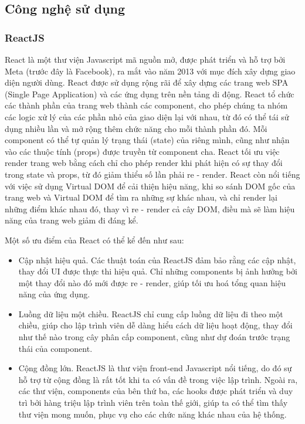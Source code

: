 \subsection{Công nghệ sử dụng}
\subsubsection{ReactJS}
React là một thư viện Javascript mã nguồn mở, được phát triển và hỗ trợ bởi
Meta (trước đây là Facebook), ra mắt vào năm 2013 với mục đích xây dựng giao
diện người dùng. React được sử dụng rộng rãi để xây dựng các trang web SPA
(Single Page Application) và các ứng dụng trên nền tảng di động. React tổ chức
các thành phần của trang web thành các component, cho phép chúng ta nhóm các
logic xử lý của các phần nhỏ của giao diện lại với nhau, từ đó có thể tái sử
dụng nhiều lần và mở rộng thêm chức năng cho mỗi thành phần đó. Mỗi component
có thể tự quản lý trạng thái (state) của riêng mình, cũng như nhận vào các
thuộc tính (props) được truyền từ component cha. React tối ưu việc render trang
web bằng cách chỉ cho phép render khi phát hiện có sự thay đổi trong state và
props, từ đó giảm thiểu số lần phải re - render. React còn nổi tiếng với việc
sử dụng Virtual DOM để cải thiện hiệu năng, khi so sánh DOM gốc của trang web
và Virtual DOM để tìm ra những sự khác nhau, và chỉ render lại những điểm khác
nhau đó, thay vì re - render cả cây DOM, điều mà sẽ làm hiệu năng của trang web
giảm đi đáng kể.
\par
Một số ưu điểm của React có thể kể đến như sau:
\begin{itemize}
    \item Cập nhật hiệu quả. Các thuật toán của ReactJS đảm bảo rằng các cập nhật, thay
          đổi UI được thực thi hiệu quả. Chỉ những components bị ảnh hưởng bởi một thay
          đổi nào đó mới được re - render, giúp tối ưu hoá tổng quan hiệu năng của ứng
          dụng.
    \item Luồng dữ liệu một chiều. ReactJS chỉ cung cấp luồng dữ liệu đi theo một chiều,
          giúp cho lập trình viên dễ dàng hiểu cách dữ liệu hoạt động, thay đổi như thế
          nào trong cây phân cấp component, cũng như dự đoán trước trạng thái của
          component.
    \item Cộng đồng lớn. ReactJS là thư viện front-end Javascript nổi tiếng, do đó sự hỗ
          trợ từ cộng đồng là rất tốt khi ta có vấn đề trong việc lập trình. Ngoài ra,
          các thư viện, components của bên thứ ba, các hooks được phát triển và duy trì
          bởi hàng triệu lập trình viên trên toàn thế giới, giúp ta có thể tìm thấy thư
          viện mong muốn, phục vụ cho các chức năng khác nhau của hệ thống.
\end{itemize}

